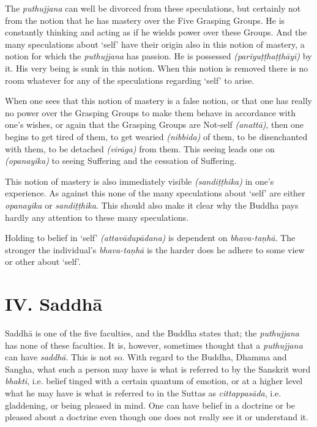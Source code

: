 The \emph{puthujjana} can well be divorced from these speculations, but certainly not from the notion that he has mastery over the Five Grasping Groups. He is constantly thinking and acting as if he wields power over these Groups. And the many speculations about `self' have their origin also in this notion of mastery, a notion for which the \emph{puthujjana} has passion. He is possessed \emph{(pariyuṭṭhaṭṭhāyī)} by it. His very being is sunk in this notion. When this notion is removed there is no room whatever for any of the speculations regarding `self' to arise.

When one sees that this notion of mastery is a false notion, or that one has really no power over the Grasping Groups to make them behave in accordance with one's wishes, or again that the Grasping Groups are Not-self \emph{(anattā)}, then one begins to get tired of them, to get wearied \emph{(nibbida)} of them, to be disenchanted with them, to be detached \emph{(virāga)} from them. This seeing leads one on \emph{(opanayika)} to seeing Suffering and the cessation of Suffering.

This notion of mastery is also immediately visible \emph{(sandiṭṭhika)} in one's experience. As against this none of the many speculations about `self' are either \emph{opanayika} or \emph{sandiṭṭhika}. This should also make it clear why the Buddha pays hardly any attention to these many speculations.

Holding to belief in `self' \emph{(attavādupādana)} is dependent on \emph{bhava-taṇhā}. The stronger the individual's \emph{bhava-taṇhā} is the harder does he adhere to some view or other about `self'.

\section{IV. Saddhā}

Saddhā is one of the five faculties, and the Buddha states that; the \emph{puthujjana} has none of these faculties. It is, however, sometimes thought that a \emph{puthujjana} can have \emph{saddhā}. This is not so. With regard to the Buddha, Dhamma and Sangha, what such a person may have is what is referred to by the Sanskrit word \emph{bhakti}, i.e. belief tinged with a certain quantum of emotion, or at a higher level what he may have is what is referred to in the Suttas as \emph{cittappasāda}, i.e. gladdening, or being pleased in mind. One can have belief in a doctrine or be pleased about a doctrine even though one does not really see it or understand it.

